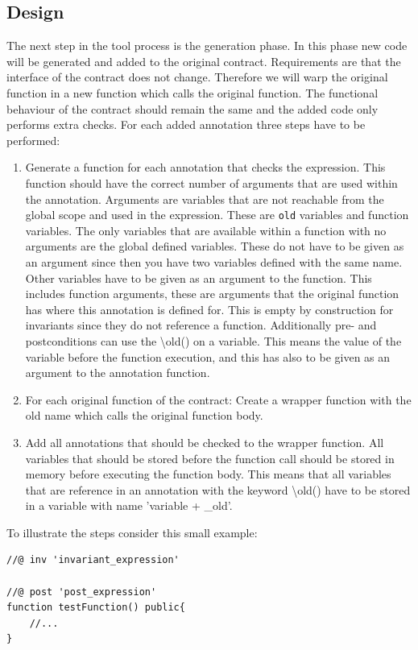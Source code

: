 \documentclass[a4paper]{article}
\begin{document}
\subsection{Design}
The next step in the tool process is the generation phase. In this phase new code will be generated and added to the original contract. Requirements are that the interface of the contract does not change. Therefore we will warp the original function in a new function which calls the original function. The functional behaviour of the contract should remain the same and the added code only performs extra checks. For each added annotation three steps have to be performed:
\begin{enumerate}
  \item Generate a function for each annotation that checks the expression. This function should have the correct number of arguments that are used within the annotation. Arguments are variables that are not reachable from the global scope and used in the expression. These are \texttt{old} variables and function variables. The only variables that are available within a function with no arguments are the global defined variables. These do not have to be given as an argument since then you have two variables defined with the same name. Other variables have to be given as an argument to the function. This includes function arguments, these are arguments that the original function has where this annotation is defined for. This is empty by construction for invariants since they do not reference a function. Additionally pre- and postconditions can use the \textbackslash old() on a variable. This means the value of the variable before the function execution, and this has also to be given as an argument to the annotation function.
  \item For each original function of the contract: Create a wrapper function with the old name which calls the original function body.
  \item Add all annotations that should be checked to the wrapper function. All variables that should be stored before the function call should be stored in memory before executing the function body. This means that all variables that are reference in an annotation with the keyword \textbackslash old() have to be stored in a variable with name 'variable + \_old'.
\end{enumerate}
To illustrate the steps consider this small example:
\begin{lstlisting}[breaklines=true, language=Solidity ]
//@ inv 'invariant_expression'

//@ post 'post_expression'
function testFunction() public{
    //...
}
\end{lstlisting}
\end{document}
